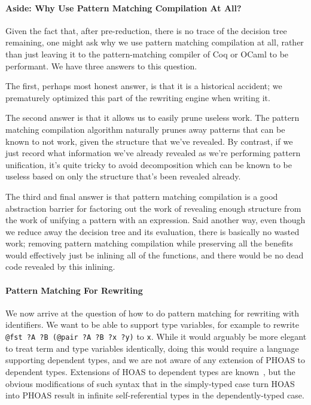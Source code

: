 \paragraph{Aside: Why Use Pattern Matching Compilation At All?}
Given the fact that, after pre-reduction, there is no trace of the decision tree remaining, one might ask why we use pattern matching compilation at all, rather than just leaving it to the pattern-matching compiler of Coq or OCaml to be performant.
We have three answers to this question.

The first, perhaps most honest answer, is that it is a historical accident; we prematurely optimized this part of the rewriting engine when writing it.

The second answer is that it allows us to easily prune useless work.
The pattern matching compilation algorithm naturally prunes away patterns that can be known to not work, given the structure that we've revealed.
By contrast, if we just record what information we've already revealed as we're performing pattern unification, it's quite tricky to avoid decomposition which can be known to be useless based on only the structure that's been revealed already.

The third and final answer is that pattern matching compilation is a good abstraction barrier for factoring out the work of revealing enough structure from the work of unifying a pattern with an expression.
Said another way, even though we reduce away the decision tree and its evaluation, there is basically no wasted work; removing pattern matching compilation while preserving all the benefits would effectively just be inlining all of the functions, and there would be no dead code revealed by this inlining.

\paragraph{Pattern Matching For Rewriting}
We now arrive at the question of how to do pattern matching for rewriting with identifiers.
We want to be able to support type variables, for example to rewrite \texttt{@fst ?A ?B (@pair ?A ?B ?x ?y)} to \texttt{x}.
While it would arguably be more elegant to treat term and type variables identically, doing this would require a language supporting dependent types, and we are not aware of any extension of PHOAS to dependent types.
Extensions of HOAS to dependent types are known~\cite{Outrageous2010McBride}, but the obvious modifications of such syntax that in the simply-typed case turn HOAS into PHOAS result in infinite self-referential types in the dependently-typed case.

